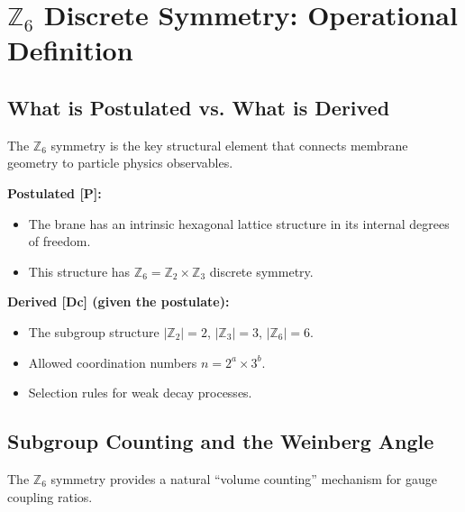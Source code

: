 \documentclass[11pt,a4paper]{article}
\begin{document}
\section{$\mathbb{Z}_6$ Discrete Symmetry: Operational Definition}
\label{sec:Z6_symmetry}

\subsection{What is Postulated vs. What is Derived}

The $\mathbb{Z}_6$ symmetry is the key structural element that connects membrane geometry to particle physics observables.

\begin{statusbox}
\textbf{Postulated [P]:}
\begin{itemize}
    \item The brane has an intrinsic hexagonal lattice structure in its internal degrees of freedom.
    \item This structure has $\mathbb{Z}_6 = \mathbb{Z}_2 \times \mathbb{Z}_3$ discrete symmetry.
\end{itemize}

\textbf{Derived [Dc] (given the postulate):}
\begin{itemize}
    \item The subgroup structure $|\mathbb{Z}_2| = 2$, $|\mathbb{Z}_3| = 3$, $|\mathbb{Z}_6| = 6$.
    \item Allowed coordination numbers $n = 2^a \times 3^b$.
    \item Selection rules for weak decay processes.
\end{itemize}
\end{statusbox}

\subsection{Subgroup Counting and the Weinberg Angle}

The $\mathbb{Z}_6$ symmetry provides a natural ``volume counting'' mechanism for gauge coupling ratios.
\end{document}
